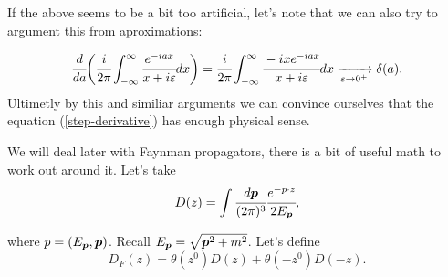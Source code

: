 \documentclass[main.tex]{subfiles}
\begin{document}
If the above seems to be a bit too artificial, let's note that we can also try to argument this from aproximations:

\begin{equation}
\cfrac{d}{da}\bigg(\cfrac{i}{2\pi} \int_{-\infty}^\infty  \cfrac{e^{-iax}}{x + i\epsilon} dx\bigg) = \cfrac{i}{2\pi} \int_{-\infty}^\infty  \cfrac{-i x e^{-iax}}{x + i\epsilon} dx
\xrightarrow[\epsilon \to 0^+]{} \delta(a).
\end{equation}
Ultimetly by this and similiar arguments we can convince ourselves that the equation (\ref{step-derivative}) has enough physical sense. 

We will deal later with Faynman propagators, there is a bit of useful math to work out around it.
Let's take
\begin{equation}
D(z) =  \int \cfrac{d \bs{p}}{(2\pi)^3}
\cfrac{e^{-p \cdot z}}{2E_{\bs{p}}}, 
\end{equation}

where $p = (E_{\bs{p}}, \bs{p})$. Recall $E_{\bs{p}} = \sqrt{\bs{p}^2 + m^2}$.
Let's define 
\begin{equation}
D_F(z) = \theta(z^0)D(z) + \theta(-z^0)D(-z).
\end{equation}
\end{document}
